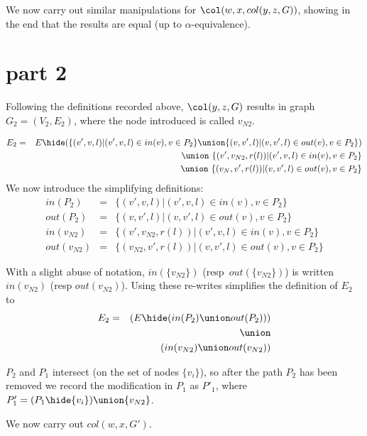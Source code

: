 \pagebreak

We now carry out similar manipulations for $\col(w,x,col(y,z,G))$, showing in the end that the results are equal (up to $\alpha$-equivalence). 

\section{part 2}

Following the definitions recorded above, $\col(y,z,G)$ results in graph $G_2=(V_2,E_2)$, where the node introduced is called $v_{N2}$. 

\begin{eqnarray*}
  E_2 & = & E\hide (
                   \{(v',v,l)|(v',v,l) \in in(v), v\in P_2\}
                   \union
                   \{(v,v',l)|(v,v',l) \in out(v), v\in P_2\}
                  )\\
  && \union\ \{(v',v_{N2},r(l))|(v',v,l) \in in(v), v\in P_2\}\\
  && \union\ \{(v_{N},v',r(l))|(v,v',l) \in out(v), v\in P_2\}
\end{eqnarray*}
We now introduce the simplifying definitions:
\begin{eqnarray*}
 in(P_2)   &=& \{(v',v,l)|(v',v,l) \in in(v), v\in P_2\} \\ 
 out(P_2)  &=& \{(v,v',l)|(v,v',l) \in out(v), v\in P_2\}\\
 in(v_{N2}) &=& \{(v',v_{N2},r(l))|(v',v,l) \in in(v), v\in P_2\} \\
 out(v_{N2})&=& \{(v_{N2},v',r(l))|(v,v',l) \in out(v), v\in P_2\} 
\end{eqnarray*}

With a slight abuse of notation, $in(\{v_{N2}\})$ (resp\ $out(\{v_{N2}\})$)  is written $in(v_{N2})$ (resp $out(v_{N2})$). Using these re-writes simplifies the definition of $E_2$ to 
\begin{eqnarray*}
  E_2  &=& ( E\hide(in(P_2) \union out(P_2)) ) \\
       &&\union\\
       && ( in(v_{N2}) \union out(v_{N2}) )
\end{eqnarray*}
       
$P_2$ and $P_1$ intersect (on the set of nodes $\{v_i\}$), so after the path $P_2$ has been removed  we record the modification in $P_1$ as $P'_1$, where $P'_1 = (P_1\hide\{v_i\})\union\{v_{N2}\}$.

We now carry out $col(w,x,G')$. 


